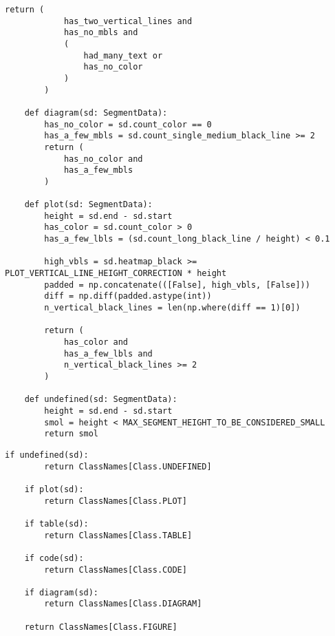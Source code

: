 \begin{lstlisting}[caption={Функция handle\_long\_black\_line (часть 2)}, label={lst:}]
        return (
            has_two_vertical_lines and
            has_no_mbls and
            (
                had_many_text or
                has_no_color
            )
        )

    def diagram(sd: SegmentData):
        has_no_color = sd.count_color == 0
        has_a_few_mbls = sd.count_single_medium_black_line >= 2
        return (
            has_no_color and
            has_a_few_mbls
        )

    def plot(sd: SegmentData):
        height = sd.end - sd.start
        has_color = sd.count_color > 0
        has_a_few_lbls = (sd.count_long_black_line / height) < 0.1

        high_vbls = sd.heatmap_black >= PLOT_VERTICAL_LINE_HEIGHT_CORRECTION * height
        padded = np.concatenate(([False], high_vbls, [False]))
        diff = np.diff(padded.astype(int))
        n_vertical_black_lines = len(np.where(diff == 1)[0])

        return (
            has_color and
            has_a_few_lbls and
            n_vertical_black_lines >= 2
        )

    def undefined(sd: SegmentData):
        height = sd.end - sd.start
        smol = height < MAX_SEGMENT_HEIGHT_TO_BE_CONSIDERED_SMALL
        return smol
\end{lstlisting}

\newpage

\begin{lstlisting}[caption={Функция handle\_long\_black\_line (часть 3)}, label={lst:}]
    if undefined(sd):
        return ClassNames[Class.UNDEFINED]

    if plot(sd):
        return ClassNames[Class.PLOT]

    if table(sd):
        return ClassNames[Class.TABLE]

    if code(sd):
        return ClassNames[Class.CODE]

    if diagram(sd):
        return ClassNames[Class.DIAGRAM]

    return ClassNames[Class.FIGURE]
\end{lstlisting}

\newpage

